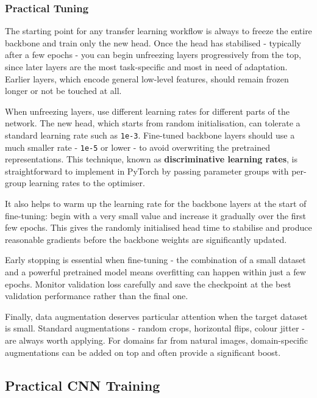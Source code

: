 \subsubsection{Practical Tuning}

The starting point for any transfer learning workflow is always to freeze the entire backbone and train only the new head. Once the head has stabilised - typically after a few epochs - you can begin unfreezing layers progressively from the top, since later layers are the most task-specific and most in need of adaptation. Earlier layers, which encode general low-level features, should remain frozen longer or not be touched at all.

When unfreezing layers, use different learning rates for different parts of the network. The new head, which starts from random initialisation, can tolerate a standard learning rate such as \texttt{1e-3}. Fine-tuned backbone layers should use a much smaller rate - \texttt{1e-5} or lower - to avoid overwriting the pretrained representations. This technique, known as \textbf{discriminative learning rates}, is straightforward to implement in PyTorch by passing parameter groups with per-group learning rates to the optimiser.

It also helps to warm up the learning rate for the backbone layers at the start of fine-tuning: begin with a very small value and increase it gradually over the first few epochs. This gives the randomly initialised head time to stabilise and produce reasonable gradients before the backbone weights are significantly updated.

Early stopping is essential when fine-tuning - the combination of a small dataset and a powerful pretrained model means overfitting can happen within just a few epochs. Monitor validation loss carefully and save the checkpoint at the best validation performance rather than the final one.

Finally, data augmentation deserves particular attention when the target dataset is small. Standard augmentations - random crops, horizontal flips, colour jitter - are always worth applying. For domains far from natural images, domain-specific augmentations can be added on top and often provide a significant boost.

\subsection{Practical CNN Training}

